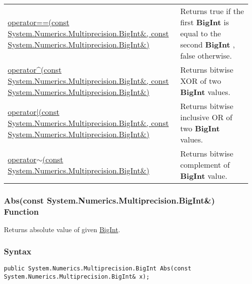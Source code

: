 \documentclass[a4paper,oneside,11.000000pt]{book}
\begin{document}
\begin{flushleft}
\begin{supertabular}[l]{!{\raggedright}p{7.575cm}!{\raggedright}p{7.575cm}}
\\
\hyperlink{System.Numerics.Multiprecision.operator.equal.C.R.System.Numerics.Multiprecision.BigInt.C.R.System.Numerics.Multiprecision.BigInt}{operator==(const System.\-Numerics.\-Multiprecision.\-BigInt\&\-, const System.\-Numerics.\-Multiprecision.\-BigInt\&\-)}
& Returns true if the first \textbf{BigInt}
 is equal to the second \textbf{BigInt}
, false otherwise.

\\
\hyperlink{System.Numerics.Multiprecision.operator.xor.C.R.System.Numerics.Multiprecision.BigInt.C.R.System.Numerics.Multiprecision.BigInt}{operator\^{}(const System.\-Numerics.\-Multiprecision.\-BigInt\&\-, const System.\-Numerics.\-Multiprecision.\-BigInt\&\-)}
& Returns bitwise XOR of two \textbf{BigInt}
 values.

\\
\hyperlink{System.Numerics.Multiprecision.operator.or.C.R.System.Numerics.Multiprecision.BigInt.C.R.System.Numerics.Multiprecision.BigInt}{operator|(const System.\-Numerics.\-Multiprecision.\-BigInt\&\-, const System.\-Numerics.\-Multiprecision.\-BigInt\&\-)}
& Returns bitwise inclusive OR of two \textbf{BigInt}
 values.

\\
\hyperlink{System.Numerics.Multiprecision.operator.complement.C.R.System.Numerics.Multiprecision.BigInt}{operator$\sim$(const System.\-Numerics.\-Multiprecision.\-BigInt\&\-)}
& Returns bitwise complement of \textbf{BigInt}
 value.

\\
\end{supertabular}

\end{flushleft}
\clearpage

\hypertarget{System.Numerics.Multiprecision.Abs.C.R.System.Numerics.Multiprecision.BigInt}{\subsubsection*{Abs(const System.Numerics.Multiprecision.BigInt\&) Function}}
\begin{flushleft}
Returns absolute value of given \hyperlink{System.Numerics.Multiprecision.BigInt}{BigInt}.

\end{flushleft}
\subsubsection*{Syntax}
\texttt{public System.Numerics.Multiprecision.BigInt Abs(const System.Numerics.Multiprecision.BigInt\& x);}
\end{document}
